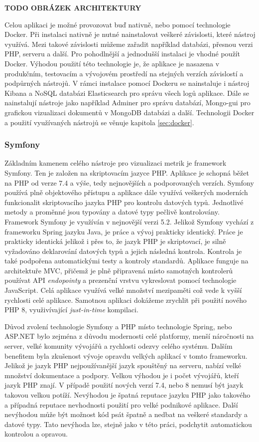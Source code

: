 \documentclass[czech,master,public,dept460,male,cpdeclaration,oneside]{diploma}
\begin{document}
 \textbf{TODO OBRÁZEK ARCHITEKTURY}
 
Celou aplikaci je možné provozovat buď nativně, nebo pomocí technologie Docker. Při instalaci nativně je nutné nainstalovat veškeré závislosti, které nástroj využívá. Mezi takové závislosti můžeme zařadit například databázi, přesnou verzi PHP, serveru a další. Pro pohodlnější a jednodušší instalaci je vhodné použít Docker. Výhodou použití této technologie je, že aplikace je nasazena v produkčním, testovacím a vývojovém prostředí na stejných verzích závislostí a podpůrných nástrojů. V rámci instalace pomocí Dockeru se nainstaluje i nástroj Kibana a NoSQL databázi Elasticsearch pro správu všech logů aplikace. Dále se nainstalují nástroje jako například Adminer pro správu databází,  Mongo-gui pro grafickou vizualizaci dokumentů v MongoDB databázi a další. Technologii Docker a použití využívaných nástrojů se věnuje kapitola \ref{sec:docker}.

\subsubsection{Symfony}
\label{sec:symfony}
Základním kamenem celého nástroje pro vizualizaci metrik je framework Symfony. Ten je založen na skriptovacím jazyce PHP. Aplikace je schopná běžet na PHP od verze 7.4 a výše, tedy nejnovějších a podporovaných verzích. Symfony používá plně objektového přístupu a aplikace dále využívá veškerých moderních funkcionalit skriptovacího jazyka PHP pro kontrolu datových typů. Jednotlivé metody a proměnné jsou typovány a datové typy pečlivě kontrolovány. Framework Symfony je využíván v nejnovější verzi 5.2. Jelikož Symfony vychází z frameworku Spring jazyku Java, je práce a vývoj prakticky identický. Práce je prakticky identická jelikož i přes to, že jazyk PHP je skriptovací, je silně vyžadováno deklarování datových typů a jejich následná kontrola. Kontrola je také podpořena automatickými testy a kontroly standardů. Aplikace funguje na architektuře MVC, přičemž je plně připravená místo samotných kontrolerů používat API \textit{endopointy} a prezenční vrstvu vykreslovat pomocí technologie JavaScript. Celá aplikace využívá velké množství mezipaměti což vede k vyšší rychlosti celé aplikace. Samotnou aplikaci dokážeme zrychlit při použití nového PHP 8, využivívající \textit{just-in-time} kompilaci.

Důvod zvolení technologie Symfony a PHP místo technologie Spring, nebo ASP.NET bylo zejména z důvodu modernosti celé platformy, menší náročnosti na server, velké komunity vývojářů a rychlosti odezvy celého systému. Dalším benefitem byla zkušenost vývoje opravdu velkých aplikací v tomto frameworku. Jelikož je jazyk PHP nejpoužívanější jazyk spouštěný na serveru, nabízí velké množství dokumentace a podpory. \cite{ref:php_trend} Velkou výhodou je i počet vývojářů, kteří jazyk PHP znají.  V případě použití nových verzí 7.4, nebo 8 nemusí být jazyk takovou velkou potíží. Nevýhodou je špatná reputace jazyku PHP jako takového a případná reputace nevhodnosti použití pro velké podnikové aplikace. Další nevýhodou může být možnost kód psát špatně a nedbat na veškeré standardy a datové typy. Tato nevýhoda lze, stejně jako v této práci, podchytit automatickou kontrolou a opravou.
\end{document}
